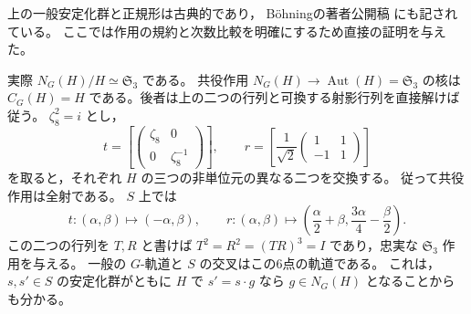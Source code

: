 \begin{remark}[既知のnormalizerによる補足]
\label{rem:binary-quartic-normalizer}
上の一般安定化群と正規形は古典的であり，
Böhningの著者公開稿\cite[Proposition~3.3.1.2, Corollary~3.3.1.3]{BohningInvariantTheory}
にも記されている。
ここでは作用の規約と次数比較を明確にするため直接の証明を与えた。

実際 $N_G(H)/H\simeq\mathfrak S_3$ である。
共役作用 $N_G(H)\to\operatorname{Aut}(H)=\mathfrak S_3$ の核は
$C_G(H)=H$ である。後者は上の二つの行列と可換する射影行列を直接解けば従う。
$\zeta_8^2=i$ とし，
\[
 t=\left[\begin{pmatrix}\zeta_8&0\\0&\zeta_8^{-1}\end{pmatrix}\right],
 \qquad
 r=\left[\frac1{\sqrt2}\begin{pmatrix}1&1\\-1&1\end{pmatrix}\right]
\]
を取ると，それぞれ $H$ の三つの非単位元の異なる二つを交換する。
従って共役作用は全射である。
$S$ 上では
\[
 t:(\alpha,\beta)\longmapsto(-\alpha,\beta),\qquad
 r:(\alpha,\beta)\longmapsto
       \left(\frac{\alpha}{2}+\beta,\frac{3\alpha}{4}-\frac{\beta}{2}\right).
\]
この二つの行列を $T,R$ と書けば
$T^2=R^2=(TR)^3=I$ であり，忠実な $\mathfrak S_3$ 作用を与える。
一般の $G$-軌道と $S$ の交叉はこの6点の軌道である。
これは，$s,s'\in S$ の安定化群がともに $H$ で
$s'=s\cdot g$ なら $g\in N_G(H)$ となることからも分かる。
\end{remark}

